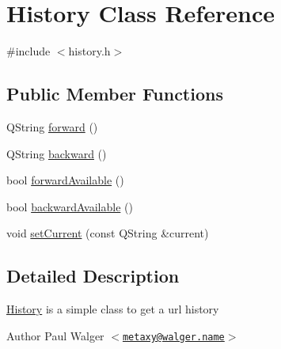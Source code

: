 \hypertarget{classHistory}{
\section{History Class Reference}
\label{classHistory}
}


{\ttfamily \#include $<$history.h$>$}

\subsection*{Public Member Functions}
\begin{DoxyCompactItemize}
\item 
QString \hyperlink{classHistory_a83d69c4bfe79d19a6187f586e7311b22}{forward} ()
\item 
QString \hyperlink{classHistory_a41c8d23cb2789b07bc6229b203bafce3}{backward} ()
\item 
bool \hyperlink{classHistory_a1227493ba04f3f640c6648b9562bf68e}{forwardAvailable} ()
\item 
bool \hyperlink{classHistory_ac8c3f249e76605c9686eacb4716c79b4}{backwardAvailable} ()
\item 
void \hyperlink{classHistory_a7fd72e5b7289c61f32ec5d533d0356bf}{setCurrent} (const QString \&current)
\end{DoxyCompactItemize}


\subsection{Detailed Description}
\hyperlink{classHistory}{History} is a simple class to get a url history

\begin{DoxyAuthor}{Author}
Paul Walger $<$\href{mailto:metaxy@walger.name}{\tt metaxy@walger.name}$>$ 
\end{DoxyAuthor}


